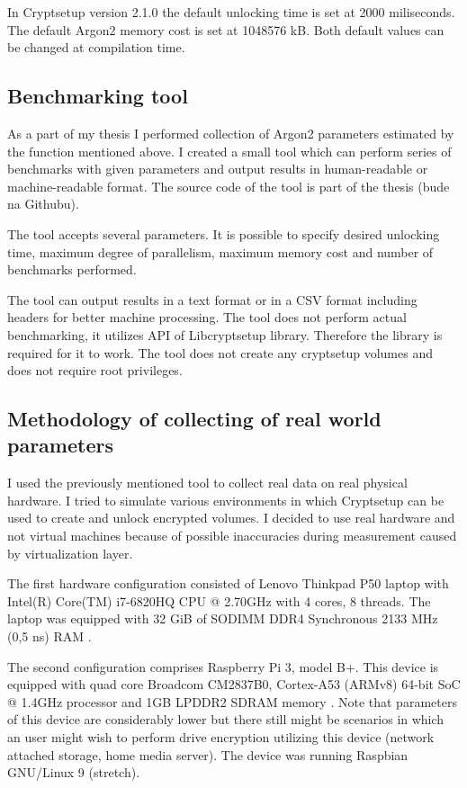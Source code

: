 \documentclass[nolof]{fithesis3}
\begin{document}
In Cryptsetup version 2.1.0 the default unlocking time is set at 2000 miliseconds. The default Argon2 memory cost is set at 1048576 kB. Both default values can be changed at compilation time.

\subsection{Benchmarking tool}
As a part of my thesis I performed collection of Argon2 parameters estimated by the function mentioned above. I created a small tool which can perform series of benchmarks with given parameters and output results in human-readable or machine-readable format. The source code of the tool is part of the thesis (bude na Githubu).

The tool accepts several parameters. It is possible to specify desired unlocking time, maximum degree of parallelism, maximum memory cost and number of benchmarks performed.

The tool can output results in a text format or in a CSV format including headers for better machine processing. The tool does not perform actual benchmarking, it utilizes API of Libcryptsetup library. Therefore the library is required for it to work. The tool does not create any cryptsetup volumes and does not require root privileges.

\subsection{Methodology of collecting of real world parameters}
\label{subsec:laptop}
I used the previously mentioned tool to collect real data on real physical hardware. I tried to simulate various environments in which Cryptsetup can be used to create and unlock encrypted volumes. I decided to use real hardware and not virtual machines because of possible inaccuracies during measurement caused by virtualization layer.

The first hardware configuration consisted of Lenovo Thinkpad P50 laptop with Intel(R) Core(TM) i7-6820HQ CPU @ 2.70GHz with 4 cores, 8 threads. The laptop was equipped with 32 GiB of SODIMM DDR4 Synchronous 2133 MHz (0,5 ns) RAM \parencite{laptopspecs}.

The second configuration comprises Raspberry Pi 3, model B+. This device is equipped with quad core Broadcom CM2837B0, Cortex-A53 (ARMv8) 64-bit SoC @ 1.4GHz processor and 1GB LPDDR2 SDRAM memory \parencite{raspberryspecs}. Note that parameters of this device are considerably lower but there still might be scenarios in which an user might wish to perform drive encryption utilizing this device (network attached storage, home media server). The device was running Raspbian GNU/Linux 9 (stretch).
\end{document}
